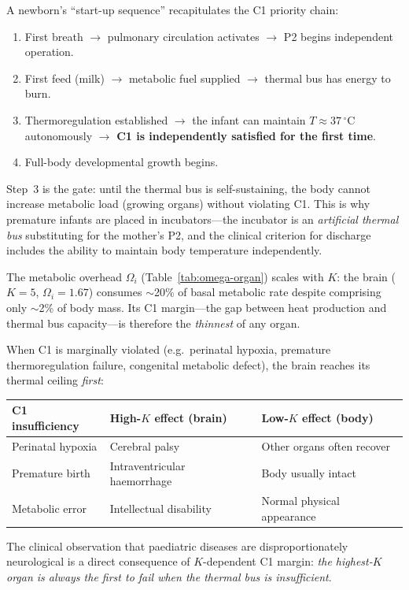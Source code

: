 \documentclass[aps,pre,twocolumn,superscriptaddress,floatfix]{revtex4-2}
\begin{document}
\begin{remark}
\label{rem:thermoregulation-trigger}
A newborn's ``start-up sequence'' recapitulates
the C1 priority chain:
\begin{enumerate}
  \item First breath $\to$ pulmonary circulation
    activates $\to$ P2 begins independent operation.
  \item First feed (milk) $\to$ metabolic fuel
    supplied $\to$ thermal bus has energy to burn.
  \item Thermoregulation established $\to$ the infant
    can maintain $T \approx 37\,^{\circ}$C autonomously
    $\to$ \textbf{C1 is independently satisfied
    for the first time}.
  \item Full-body developmental growth begins.
\end{enumerate}
Step~3 is the gate: until the thermal bus is
self-sustaining, the body cannot increase metabolic
load (growing organs) without violating C1.
This is why premature infants are placed in
incubators---the incubator is an \emph{artificial
thermal bus} substituting for the mother's P2,
and the clinical criterion for discharge includes
the ability to maintain body temperature
independently.
\end{remark}

\begin{remark}
\label{rem:brain-vulnerability}
The metabolic overhead $\Omega_i$
(Table~\ref{tab:omega-organ}) scales with $K$:
the brain ($K=5$, $\Omega_i = 1.67$) consumes
$\sim$20\% of basal metabolic rate despite
comprising only $\sim$2\% of body mass.
Its C1 margin---the gap between heat production
and thermal bus capacity---is therefore the
\emph{thinnest} of any organ.

When C1 is marginally violated (e.g.\ perinatal
hypoxia, premature thermoregulation failure,
congenital metabolic defect), the brain reaches
its thermal ceiling \emph{first}:
\begin{center}
\begin{tabular}{lll}
\toprule
C1 insufficiency & High-$K$ effect (brain) &
  Low-$K$ effect (body) \\
\midrule
Perinatal hypoxia &
  Cerebral palsy &
  Other organs often recover \\
Premature birth &
  Intraventricular haemorrhage &
  Body usually intact \\
Metabolic error &
  Intellectual disability &
  Normal physical appearance \\
\bottomrule
\end{tabular}
\end{center}
The clinical observation that paediatric diseases are
disproportionately neurological is a direct
consequence of $K$-dependent C1 margin:
\emph{the highest-$K$ organ is always the first to
fail when the thermal bus is insufficient}.
\end{remark}
\end{document}
